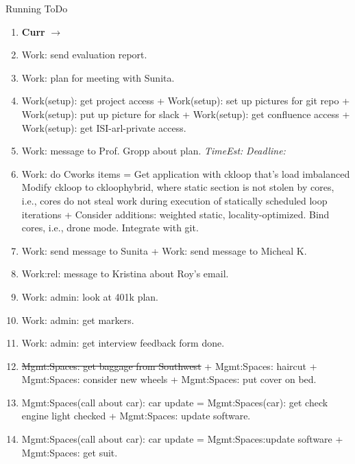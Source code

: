 \documentclass[serif, mathserif, final]{beamer}
\newcommand{\doneTaskNoItem}[1]{\sout{#1}}
\newcommand{\te}[1]{\textit{TimeEst:}\textit{#1}}
\newcommand{\dl}[1]{\textit{Deadline:}\textit{#1}}
\begin{document}
\begin{frame}
\begin{columns}
\begin{column}{0.5\linewidth}
  \begin{block}{Running ToDo} %
    \begin{enumerate}
    \tiny \item \tiny \textbf{Curr} $\rightarrow$
    \tiny \item \tiny Work: send evaluation report.     
  \item \tiny Work: plan for meeting with Sunita.
  \item \tiny Work(setup): get project access + Work(setup):
    set up pictures for git repo + Work(setup): put up picture for
    slack +  Work(setup): get confluence access + Work(setup): get ISI-arl-private
    access.
  \item \tiny Work: message to Prof. Gropp about plan. \te{} \dl{} 

  \item \tiny Work: do Cworks items = Get application with ckloop
    that’s load imbalanced Modify ckloop to ckloophybrid, where
    static section is not stolen by cores, i.e., cores do not steal
    work during execution of statically scheduled loop iterations +
    Consider additions: weighted static, locality-optimized. Bind
    cores, i.e., drone mode. Integrate with git.  
 
  \item \tiny Work: send message to Sunita + Work: send message to
    Micheal K. 
    
  \item \tiny Work:rel: message to Kristina about Roy's email. 
 

    \tiny \item \tiny Work: admin: look at 401k plan. 

    \tiny \item \tiny Work: admin: get markers. 
    \tiny \item \tiny Work: admin: get interview feedback form done. 

  \item \tiny \doneTaskNoItem{Mgmt:Spaces: get baggage from Southwest}
    + Mgmt:Spaces: haircut + Mgmt:Spaces: consider new wheels +
    Mgmt:Spaces: put cover on bed. 

  \item \tiny Mgmt:Spaces(call about car): car update  = Mgmt:Spaces(car): get check engine light checked +
    Mgmt:Spaces: update software.

  \item \tiny Mgmt:Spaces(call about car): car update =
    Mgmt:Spaces:update software +  Mgmt:Spaces: get suit. 


\end{enumerate}
\end{block}
\end{column}
\end{columns}
\end{frame}
\end{document}

